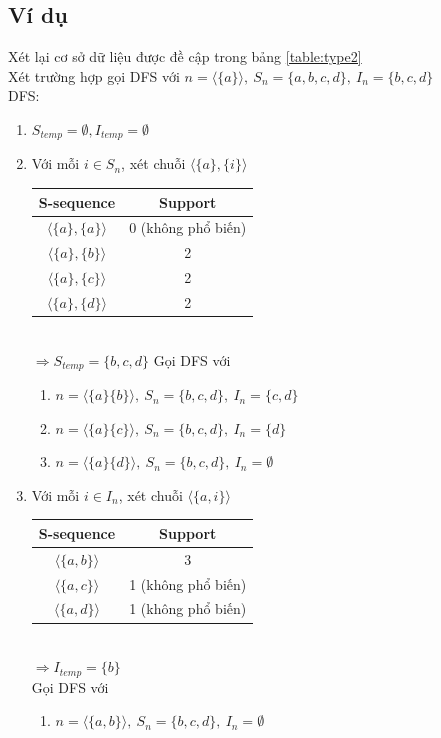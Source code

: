 \documentclass[a4paper 14pt]{article}
\begin{document}
		\subsection{Ví dụ}
			Xét lại cơ sở dữ liệu được đề cập trong bảng \ref{table:type2}\\
			Xét trường hợp gọi DFS với $n = \langle \{a\} \rangle,~S_n = \{a,b,c,d\},~I_n=\{b,c,d\}$\\
			DFS:
			\begin{enumerate}
				\item $S_{temp} = \emptyset, I_{temp} = \emptyset$
				\item Với mỗi $i \in S_n$, xét chuỗi $\langle \{a\}, \{i\} \rangle$\\
					\begin{tabular}{|c|c|}
						\hline
						S-sequence & Support \\ \hline
						$\langle \{a\}, \{a\} \rangle$ & 0 (không phổ biến) \\ \hline
						$\langle \{a\}, \{b\} \rangle$ & 2 \\ \hline
						$\langle \{a\}, \{c\} \rangle$ & 2 \\ \hline
						$\langle \{a\}, \{d\} \rangle$ & 2 \\ \hline
					\end{tabular}\\
					$\Rightarrow S_{temp} = \{b,c,d\}$
					Gọi DFS với\\
					\begin{enumerate}
						\item $n = \langle \{a\} \{b\} \rangle,~S_n = \{b,c,d\},~I_n=\{c,d\}$
						\item $n = \langle \{a\} \{c\} \rangle,~S_n = \{b,c,d\},~I_n=\{d\}$
						\item $n = \langle \{a\} \{d\} \rangle,~S_n = \{b,c,d\},~I_n=\emptyset$
					\end{enumerate}
				\item Với mỗi $i \in I_n$, xét chuỗi $\langle \{a,i\} \rangle$\\
					\begin{tabular}{|c|c|}
						\hline
						S-sequence & Support \\ \hline
						$\langle \{a,b\} \rangle$ & 3  \\ \hline
						$\langle \{a,c\} \rangle$ & 1 (không phổ biến)\\ \hline
						$\langle \{a,d\} \rangle$ & 1 (không phổ biến)\\ \hline
					\end{tabular}\\
					$\Rightarrow I_{temp} = \{b\}$\\
					Gọi DFS với
					\begin{enumerate}
						\item $n = \langle \{a,b\} \rangle,~S_n = \{b,c,d\},~I_n=\emptyset$
					\end{enumerate}
			\end{enumerate}
			
\end{document}
